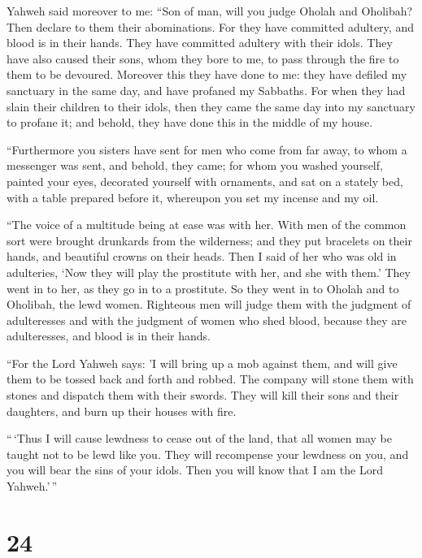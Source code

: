  Yahweh said moreover to me: ``Son of man, will you judge
Oholah and Oholibah? Then declare to them their abominations.
 For they have committed adultery, and blood is in their
hands. They have committed adultery with their idols. They have also
caused their sons, whom they bore to me, to pass through the fire to
them to be devoured.  Moreover this they have done to me:
they have defiled my sanctuary in the same day, and have profaned my
Sabbaths.  For when they had slain their children to
their idols, then they came the same day into my sanctuary to profane
it; and behold, they have done this in the middle of my house.

 ``Furthermore you sisters have sent for men who come
from far away, to whom a messenger was sent, and behold, they came; for
whom you washed yourself, painted your eyes, decorated yourself with
ornaments,  and sat on a stately bed, with a table
prepared before it, whereupon you set my incense and my oil.

 ``The voice of a multitude being at ease was with her.
With men of the common sort were brought drunkards from the wilderness;
and they put bracelets on their hands, and beautiful crowns on their
heads.  Then I said of her who was old in adulteries,
`Now they will play the prostitute with her, and she with them.'
 They went in to her, as they go in to a prostitute. So
they went in to Oholah and to Oholibah, the lewd women. 
Righteous men will judge them with the judgment of adulteresses and with
the judgment of women who shed blood, because they are adulteresses, and
blood is in their hands.

 ``For the Lord Yahweh says: 'I will bring up a mob
against them, and will give them to be tossed back and forth and robbed.
 The company will stone them with stones and dispatch
them with their swords. They will kill their sons and their daughters,
and burn up their houses with fire.

 ``\,`Thus I will cause lewdness to cease out of the
land, that all women may be taught not to be lewd like you.
 They will recompense your lewdness on you, and you will
bear the sins of your idols. Then you will know that I am the Lord
Yahweh.'\,''

\hypertarget{section-22}{%
\section{24}\label{section-22}}

